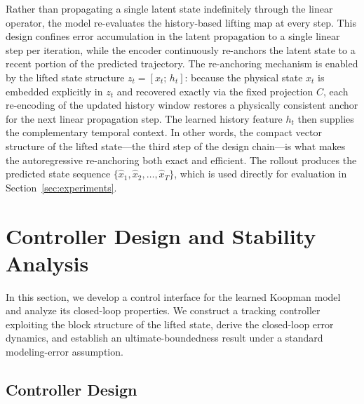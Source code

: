 \documentclass[journal]{IEEEtran}
\begin{document}
Rather than propagating a single latent state indefinitely through the linear operator, the model re-evaluates the history-based lifting map at every step. This design confines error accumulation in the latent propagation to a single linear step per iteration, while the encoder continuously re-anchors the latent state to a recent portion of the predicted trajectory. The re-anchoring mechanism is enabled by the lifted state structure $z_t = [x_t;\, h_t]$: because the physical state $x_t$ is embedded explicitly in $z_t$ and recovered exactly via the fixed projection $C$, each re-encoding of the updated history window restores a physically consistent anchor for the next linear propagation step. The learned history feature $h_t$ then supplies the complementary temporal context. In other words, the compact vector structure of the lifted state---the third step of the design chain---is what makes the autoregressive re-anchoring both exact and efficient. The rollout produces the predicted state sequence $\{\hat{x}_1,\hat{x}_2,\ldots,\hat{x}_T\}$, which is used directly for evaluation in Section~\ref{sec:experiments}.

\section{Controller Design and Stability Analysis}
\label{sec:control}

In this section, we develop a control interface for the learned Koopman model and analyze its closed-loop properties. We construct a tracking controller exploiting the block structure of the lifted state, derive the closed-loop error dynamics, and establish an ultimate-boundedness result under a standard modeling-error assumption.

\subsection{Controller Design}
\label{subsec:controller_design}
\end{document}
